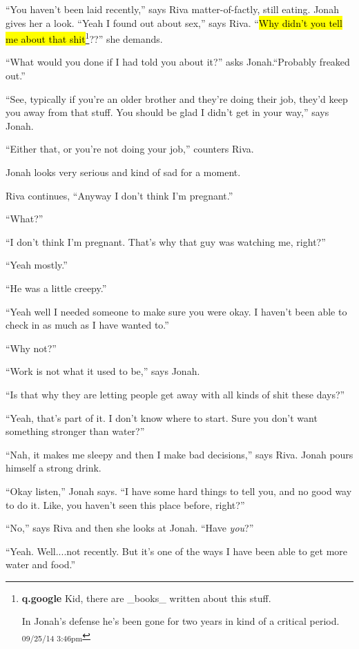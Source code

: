 ``You haven't been laid recently,'' says Riva matter-of-factly, still eating.  Jonah gives her a look.  ``Yeah I found out about sex,'' says Riva.  ``\hl{Why didn't you tell me about that shit}\footnote{\textbf{q.google }Kid, there are \_books\_ written about this stuff.

In Jonah's defense he's been gone for two years in kind of a critical period. \textsubscript{09/25/14 3:46pm}}??'' she demands.

``What would you done if I had told you about it?'' asks Jonah.``Probably freaked out.''

``See, typically if you're an older brother and they're doing their job, they'd keep you away from that stuff.  You should be glad I didn't get in your way,'' says Jonah.

``Either that, or you're not doing your job,'' counters Riva.

Jonah looks very serious and kind of sad for a moment.

Riva continues, ``Anyway I don't think I'm pregnant.''

``What?''

``I don't think I'm pregnant.  That's why that guy was watching me, right?''

``Yeah mostly.''

``He was a little creepy.''

``Yeah well I needed someone to make sure you were okay.  I haven't been able to check in as much as I have wanted to.''

``Why not?''

``Work is not what it used to be,'' says Jonah.

``Is that why they are letting people get away with all kinds of shit these days?''

``Yeah, that's part of it.  I don't know where to start.  Sure you don't want something stronger than water?''

``Nah, it makes me sleepy and then I make bad decisions,'' says Riva.  Jonah pours himself a strong drink.

``Okay listen,'' Jonah says.  ``I have some hard things to tell you, and no good way to do it.  Like, you haven't seen this place before, right?''

``No,'' says Riva and then she looks at Jonah. ``Have \textit{you}?''

``Yeah.  Well....not recently.  But it's one of the ways I have been able to get more water and food.''

